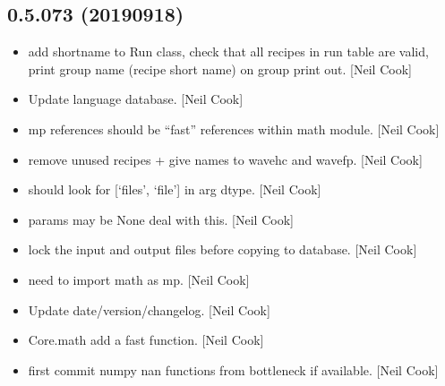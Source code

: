 \documentclass[a4paper,10pt,english]{report}
\begin{document}
\subsection{0.5.073 (2019\sphinxhyphen{}09\sphinxhyphen{}18)}
\label{\detokenize{misc/changelog:id89}}\begin{itemize}
\item {} 
 \sphinxhyphen{} add shortname to Run class,
check that all recipes in run table are valid, print group name
(recipe short name) on group print out. {[}Neil Cook{]}

\item {} 
Update language database. {[}Neil Cook{]}

\item {} 
 \sphinxhyphen{} mp references should be “fast” references within
math module. {[}Neil Cook{]}

\item {} 
 \sphinxhyphen{} remove unused recipes + give names to
wavehc and wavefp. {[}Neil Cook{]}

\item {} 
 \sphinxhyphen{}  should look for {[}‘files’,
‘file’{]} in arg dtype. {[}Neil Cook{]}

\item {} 
 \sphinxhyphen{} params may be None \sphinxhyphen{} deal with this. {[}Neil
Cook{]}

\item {} 
 \sphinxhyphen{} lock the input and output files before copying to
database. {[}Neil Cook{]}

\item {} 
 \sphinxhyphen{} need to import math as mp. {[}Neil
Cook{]}

\item {} 
Update date/version/changelog. {[}Neil Cook{]}

\item {} 
Core.math \sphinxhyphen{} add a fast  function. {[}Neil Cook{]}

\item {} 
 \sphinxhyphen{} first commit numpy nan functions from bottleneck
if available. {[}Neil Cook{]}


\end{itemize}
\end{document}
